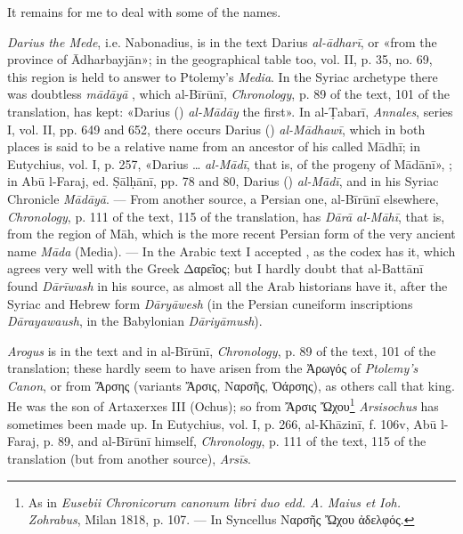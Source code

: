 \documentclass[11pt]{article}
\begin{document}
\par It remains for me to deal with some of the names.\par
\par \emph{Darius the Mede}, i.e. Nabonadius, is in the text Darius \emph{al-ādharī}, or «from the province of Ādharbayjān»; in the geographical table too, vol. II, p. 35, no. 69, this region is held to answer to Ptolemy's \emph{Media}. In the Syriac archetype there was doubtless \emph{mādāyā} , which al-Bīrūnī, \emph{Chronology}, p. 89 of the text, 101 of the translation, has kept: «Darius () \emph{al-Mādāy} the first». In al-Ṭabarī, \emph{Annales}, series I, vol. II, pp. 649 and 652, there occurs Darius () \emph{al-Mādhawī}, which in both places is said to be a relative name from an ancestor of his called Mādhī; in Eutychius, vol. I, p. 257, «Darius … \emph{al-Mādī}, that is, of the progeny of Mādānī», ; in Abū l-Faraj, ed. Ṣālḥānī, pp. 78 and 80, Darius () \emph{al-Mādī}, and in his Syriac Chronicle \emph{Mādāyā}. — From another source, a Persian one, al-Bīrūnī elsewhere, \emph{Chronology}, p. 111 of the text, 115 of the translation, has \emph{Dārā al-Māhī}, that is, from the region of Māh, which is the more recent Persian form of the very ancient name \emph{Māda} (Media). — In the Arabic text I accepted , as the codex has it, which agrees very well with the Greek {\greekfont Δαρεῖος}; but I hardly doubt that al-Battānī found  \emph{Dārīwash} in his source, as almost all the Arab historians have it, after the Syriac and Hebrew form \emph{Dāryāwesh} (in the Persian cuneiform inscriptions \emph{Dārayawaush}, in the Babylonian \emph{Dāriyāmush}).\par
\par \emph{Arogus} is  in the text and  in al-Bīrūnī, \emph{Chronology}, p. 89 of the text, 101 of the translation; these hardly seem to have arisen from the {\greekfont Ἀρωγός} of \emph{Ptolemy's Canon}, or from {\greekfont Ἄρσης} (variants {\greekfont Ἄρσις, Ναρσῆς, Ὀάρσης}), as others call that king. He was the son of Artaxerxes III (Ochus); so from {\greekfont Ἄρσις Ὤχου}\footnote{As in \emph{Eusebii Chronicorum canonum libri duo edd. A. Maius et Ioh. Zohrabus}, Milan 1818, p. 107. — In Syncellus {\greekfont Ναρσῆς Ὤχου ἀδελφός}.} \emph{Arsisochus} has sometimes been made up. In Eutychius, vol. I, p. 266, al-Khāzinī, f. 106v, Abū l-Faraj, p. 89, and al-Bīrūnī himself, \emph{Chronology}, p. 111 of the text, 115 of the translation (but from another source), \emph{Arsīs}.\par
\end{document}
